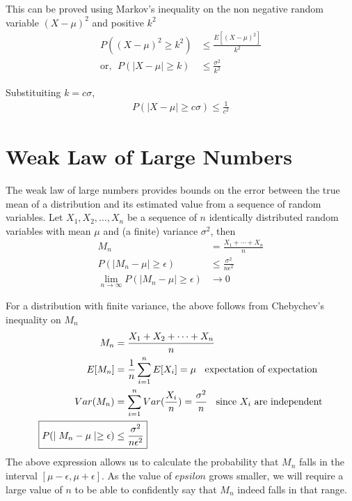 \documentclass[../probability-notes.tex]{subfiles}
\begin{document}
    This can be proved using Markov's inequality on the non negative random variable $(X-\mu)^{2}$ and positive $k^{2}$
    \begin{align*}
        P((X-\mu)^{2} \geq k^{2}) &\leq \frac{E[(X-\mu)^{2}]}{k^{2}}\\
        \text{or, } \; P(\lvert X - \mu \rvert \geq k) &\leq \frac{\sigma^{2}}{k^{2}}
    \end{align*}

    Substituiting $k = c\sigma$,
    \begin{align*}
        P(\lvert X - \mu \rvert \geq c\sigma) \leq \frac{1}{c^{2}}
    \end{align*}


    \section{Weak Law of Large Numbers}
    The weak law of large numbers provides bounds on the error between the true mean of a distribution and its estimated value from a sequence of random variables. Let $X_{1}, X_{2}, \ldots, X_{n}$ be a sequence of $n$ identically distributed random variables with mean $\mu$ and (a finite) variance $\sigma^{2}$, then
    \begin{align*}
        M_{n} &= \frac{X_{1} + \cdots + X_{n}}{n}\\
        P(\mid M_{n} - \mu \mid \geq \epsilon) &\leq \frac{\sigma^{2}}{n\epsilon^{2}}\\
        \lim_{n \to \infty} P(\mid M_{n} - \mu \mid \geq \epsilon) &\to 0
    \end{align*}

    For a distribution with finite variance, the above follows from Chebychev's inequality on $M_{n}$
    \begin{align*}
        M_{n} &= \frac{X_{1} + X_{2} + \cdots + X_{n}}{n} \\
        E[M_{n}] &= \frac{1}{n} \sum_{i=1}^{n} E[X_{i}] = \mu \text{\;\; expectation of expectation} \\
        Var(M_{n}) &= \sum_{i=1}^{n} Var(\frac{X_{i}}{n}) = \frac{\sigma^{2}}{n} \text{\;\; since $X_{i}$ are independent} \\
        \Aboxed{P(\mid M_{n} - \mu \mid \geq \epsilon) &\leq \frac{\sigma^{2}}{n\epsilon^{2}}}
    \end{align*}
    The above expression allows us to calculate the probability that $M_{n}$ falls in the interval $[\mu-\epsilon, \mu+\epsilon]$. As the value of $epsilon$ grows smaller, we will require a large value of $n$ to be able to confidently say that $M_{n}$ indeed falls in that range.\newline
\end{document}
